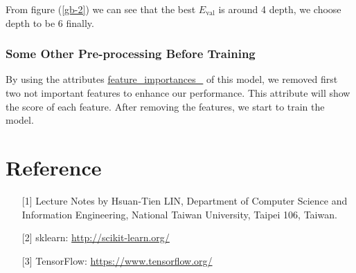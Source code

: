 \documentclass[12pt]{article}
\begin{document}
From figure (\ref{gb-2}) we can see that the best $E_{\text{val}}$ is around 4 depth, we choose depth to be 6 finally.

\subsubsection{Some Other Pre-processing Before Training}

By using the attributes \url{feature_importances_} of this model, we removed first two not important features to enhance our performance. This attribute will show the score of each feature. After removing the features, we start to train the model.

\section*{Reference}

\begin{enumerate}

\item[{[1]}] Lecture Notes by Hsuan-Tien LIN, Department of Computer Science and Information Engineering, National Taiwan University, Taipei 106, Taiwan.

\item[{[2]}] sklearn: \url{http://scikit-learn.org/}

\item[{[3]}] TensorFlow: \url{https://www.tensorflow.org/}

\end{enumerate}
\end{document}
